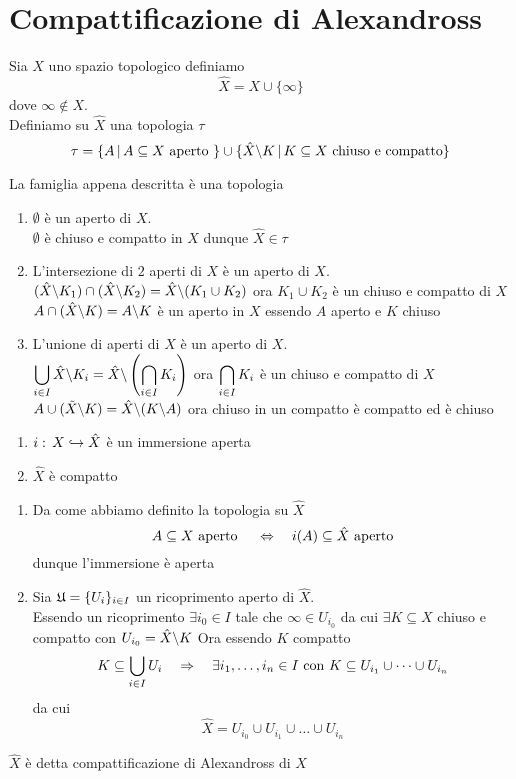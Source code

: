 \section{Compattificazione di Alexandross}
Sia $X$ uno spazio topologico definiamo 
$$ \hat{X}= X \cup \{ \infty\}$$ 
dove $\infty \not \in X $.\\
Definiamo su $\hat{X}$ una topologia $\tau$
$$ \tau =\{ A  \, \vert \, A\subseteq X \text{ aperto } \} \cup \{ \hat{X} \backslash K \, \vert \, K \subseteq X \text{ chiuso e compatto} \}$$
\begin{prop}La famiglia appena descritta \`e una topologia
\proof \bbianco
\begin{enumerate}
\item $\emptyset$ \`e un aperto di $X$.\\$\emptyset$ \`e chiuso e compatto in $X$ dunque $\hat{X} \in \tau$
\item L'intersezione di $2$ aperti di $X$  \`e un aperto di $X$.\\
$ ( \hat{X}\backslash K_1) \cap ( \hat{X}\backslash K_2) = \hat{X}\backslash ( K_1 \cup K_2)$ ora $K_1 \cup K_2 $ \`e un chiuso e compatto di $X$\\
$A \cap (\hat{X}\backslash K)= A \backslash K $ \`e un aperto in $X$ essendo $A$ aperto e $K$ chiuso
\item L'unione di aperti di $X$ \`e un aperto di $X$.\\
$\displaystyle \bigcup_{i\in I } \hat{X}\backslash K_i = \hat{X}\backslash \left( \bigcap_{i\in I } K_i\right)$ ora $\displaystyle \bigcap_{i\in I } K_i$ \`e un chiuso e compatto di  $X$\\
$A \cup (\tilde{X}\backslash K) = \hat{X}\backslash ( K \backslash A )$ ora chiuso in un compatto \`e compatto ed \`e chiuso
\end{enumerate}
\endproof
\end{prop}
\spazio
\begin{prop}[Propiet\`a]\bianco
\begin{enumerate}
\item $i:\, X \hookrightarrow \hat{X}$ \`e un immersione aperta
\item $\hat{X}$ \`e compatto
\end{enumerate}
\proof \bbianco
\begin{enumerate}
\item Da come abbiamo definito la topologia su $\hat{X}$ 
$$ A \subseteq X \text{ aperto } \quad \Leftrightarrow \quad i(A) \subseteq \hat{X}\text{ aperto}$$
dunque l'immersione \`e aperta
\item  Sia $\mathfrak{U}= \displaystyle \{ U_i\}_{i\in I } $ un ricoprimento aperto di $\hat{X}$.\\
Essendo un ricoprimento $ \exists i_0\in I $ tale che $\infty \in U_{i_0}$ da cui $\exists K \subseteq X $ chiuso e compatto con $U_{i_0}=\hat{X}\backslash K $
Ora essendo $K$ compatto 
$$ K \subseteq \bigcup_{i\in I } U_i \quad \Rightarrow \quad \exists i_1, \dots, i_n \in I \text{ con } K \subseteq U_{i_1} \cup \dots \cup U_{i_n}$$ 
da cui 
$$ \hat{X}= U_{i_0} \cup   U_{i_1} \cup \dots \cup U_{i_n}$$
\end{enumerate}
\endproof
\end{prop}
\begin{defn}$\hat{X}$ \`e detta compattificazione di Alexandross di $X$
\end{defn}
